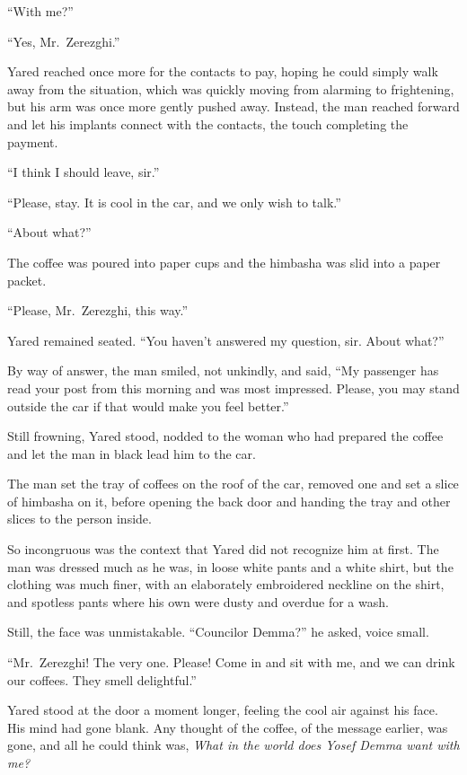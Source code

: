 ``With me?''

``Yes, Mr.~Zerezghi.''

Yared reached once more for the contacts to pay, hoping he could simply walk away from the situation, which was quickly moving from alarming to frightening, but his arm was once more gently pushed away. Instead, the man reached forward and let his implants connect with the contacts, the touch completing the payment.

``I think I should leave, sir.''

``Please, stay. It is cool in the car, and we only wish to talk.''

``About what?''

The coffee was poured into paper cups and the himbasha was slid into a paper packet.

``Please, Mr.~Zerezghi, this way.''

Yared remained seated. ``You haven't answered my question, sir. About what?''

By way of answer, the man smiled, not unkindly, and said, ``My passenger has read your post from this morning and was most impressed. Please, you may stand outside the car if that would make you feel better.''

Still frowning, Yared stood, nodded to the woman who had prepared the coffee and let the man in black lead him to the car.

The man set the tray of coffees on the roof of the car, removed one and set a slice of himbasha on it, before opening the back door and handing the tray and other slices to the person inside.

So incongruous was the context that Yared did not recognize him at first. The man was dressed much as he was, in loose white pants and a white shirt, but the clothing was much finer, with an elaborately embroidered neckline on the shirt, and spotless pants where his own were dusty and overdue for a wash.

Still, the face was unmistakable. ``Councilor Demma?'' he asked, voice small.

``Mr.~Zerezghi! The very one. Please! Come in and sit with me, and we can drink our coffees. They smell delightful.''

Yared stood at the door a moment longer, feeling the cool air against his face. His mind had gone blank. Any thought of the coffee, of the message earlier, was gone, and all he could think was, \emph{What in the world does Yosef Demma want with me?}


